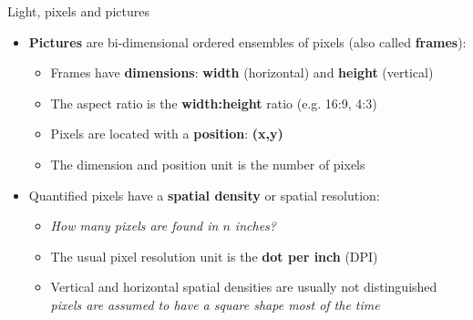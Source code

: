 \begin{frame}{Light, pixels and pictures}
  \begin{itemize}
  \item \textbf{Pictures} are bi-dimensional ordered ensembles of pixels (also called \textbf{frames}):
    \begin{itemize}
    \item Frames have \textbf{dimensions}: \textbf{width} (horizontal) and \textbf{height} (vertical)
    \item The aspect ratio is the \textbf{width:height} ratio (e.g. 16:9, 4:3)
    \item Pixels are located with a \textbf{position}: \textbf{(x,y)}
    \item The dimension and position unit is the number of pixels
    \end{itemize}
  \item Quantified pixels have a \textbf{spatial density} or spatial resolution:\\
    \begin{itemize}
    \item \textit{How many pixels are found in \(n\) inches?}
    \item The usual pixel resolution unit is the \textbf{dot per inch} (DPI)
    \item Vertical and horizontal spatial densities are usually not distinguished\\
      \textit{pixels are assumed to have a square shape most of the time}
    \end{itemize}
  \end{itemize}

\end{frame}


